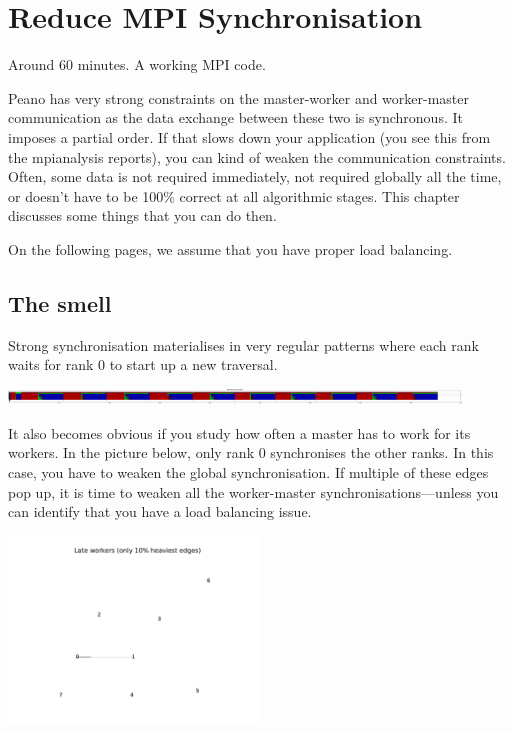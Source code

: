 \section{Reduce MPI Synchronisation}


\chapterDescription
  {
    Around 60 minutes.
  }
  {
    A working MPI code.
  }


Peano has very strong constraints on the master-worker and worker-master
communication as the data exchange between these two is synchronous. It imposes
a partial order. If that slows down your application (you see this from the
mpianalysis reports), you can kind of weaken the communication constraints. 
Often, some data is not required immediately, not required globally all the
time, or doesn't have to be 100\% correct at all algorithmic stages. This
chapter discusses some things that you can do then.

On the following pages, we assume that you have proper load balancing.


\subsection{The smell}

Strong synchronisation materialises in very regular patterns where each rank
waits for rank 0 to start up a new traversal.

\begin{center}
  \includegraphics[width=0.9\textwidth]{43_mpi-synchronisation/mpi-phases-before.pdf}
\end{center}

\noindent
It also becomes obvious if you study how often a master has to work for its 
workers. 
In the picture below, only rank 0 synchronises the other ranks.
In this case, you have to weaken the global synchronisation.
If multiple of these edges pop up, it is time to weaken all the worker-master
synchronisations---unless you can identify that you have a load balancing issue.


\begin{center}
  \includegraphics[width=0.5\textwidth]{43_mpi-synchronisation/master-worker-before.pdf}
\end{center}


